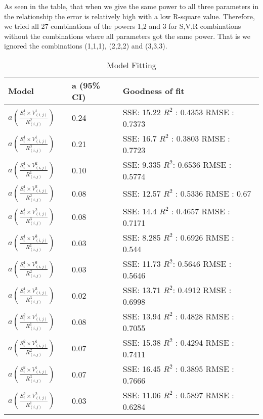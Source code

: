 \documentclass[10pt]{article}
\begin{document}
As seen in the table, that when we give the same power to all three parameters in the relationship the error is relatively high with a low R-square value. Therefore, we tried all 27 combinations of the powers 1,2 and 3 for S,V,R combinations without the combinations where all parameters got the same power. That is we ignored the combinations (1,1,1), (2,2,2) and (3,3,3).
\begin{center}
\begin{table}[htbp]
\caption{Model Fitting}
\begin{center}
\begin{adjustbox}{width=0.5\textwidth} 
\begin{tabular}{|p{0.25\linewidth}|p{0.2\linewidth}|p{0.55\linewidth}|} 
\hline
Model & a (95\% CI) & Goodness of fit\\
\hline
 $a(  \frac{S_{i}^1 \times V_{(i,j)}^1}{R_{(i,j)}^2})$ & 0.24 &  SSE: 15.22   $R^2$ : 0.4353  RMSE : 0.7373\\
\hline
 $a(  \frac{S_{i}^1 \times V_{(i,j)}^1}{R_{(i,j)}^3}) $ & 0.21 & SSE: 16.7  $R^2$ : 0.3803  RMSE : 0.7723 \\
\hline
 $a(  \frac{S_{i}^1 \times V_{(i,j)}^2}{R_{(i,j)}^1})$ & 0.10 & SSE: 9.335 $R^2$: 0.6536  RMSE : 0.5774 \\
\hline
$a(  \frac{S_{i}^1 \times V_{(i,j)}^2}{R_{(i,j)}^2})$ & 0.08 & SSE: 12.57  $R^2$ : 0.5336  RMSE : 0.67 \\
\hline
$a(  \frac{S_{i}^1 \times V_{(i,j)}^2}{R_{(i,j)}^3})$ & 0.08 &   SSE: 14.4  $R^2$ : 0.4657  RMSE : 0.7171\\
\hline
$a(  \frac{S_{i}^1 \times V_{(i,j)}^3}{R_{(i,j)}^1})$ & 0.03 & SSE: 8.285  $R^2$ : 0.6926  RMSE : 0.544 \\
\hline
$a(  \frac{S_{i}^1 \times V_{(i,j)}^3}{R_{(i,j)}^2})$ & 0.03 & SSE: 11.73  $R^2$: 0.5646  RMSE : 0.5646 \\
\hline
 $a(  \frac{S_{i}^1 \times V_{(i,j)}^3}{R_{(i,j)}^3})$ & 0.02 &  SSE: 13.71  $R^2$: 0.4912  RMSE : 0.6998 \\
\hline
 $a(  \frac{S_{i}^2 \times V_{(i,j)}^1}{R_{(i,j)}^1})$ & 0.08 &  SSE: 13.94  $R^2$ : 0.4828  RMSE : 0.7055 \\
\hline
 $a(  \frac{S_{i}^2 \times V_{(i,j)}^1}{R_{(i,j)}^2})$ & 0.07 & SSE: 15.38  $R^2$ : 0.4294 RMSE : 0.7411  \\
\hline
$a(  \frac{S_{i}^2 \times V_{(i,j)}^1}{R_{(i,j)}^3})$ & 0.07 &  SSE: 16.45  $R^2$ : 0.3895 RMSE : 0.7666  \\
\hline
 $a(  \frac{S_{i}^2 \times V_{(i,j)}^2}{R_{(i,j)}^1})$ & 0.03 & SSE: 11.06  $R^2$ : 0.5897  RMSE : 0.6284 \\

\end{tabular}
\end{adjustbox}
\end{center}
\end{table}
\end{center}
\end{document}
